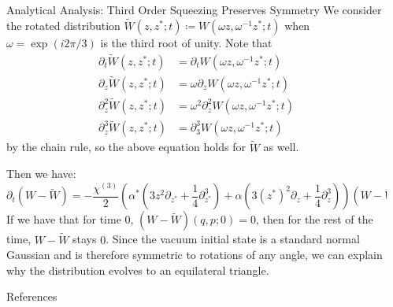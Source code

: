 \documentclass[final]{beamer}
\newcommand*{\wigner}{W(\omega z, \omega^{-1}z^{*};t)}
\newlength{\sepwidth}
\newlength{\colwidth}
\newcommand{\separatorcolumn}{\begin{column}{\sepwidth}\end{column}}
\begin{document}
\begin{frame}[t]
\begin{columns}[t]
\begin{column}{\colwidth}
\begin{block}{Analytical Analysis: Third Order Squeezing Preserves Symmetry}
        We consider the rotated distribution $\tilde{W}(z,z^{*};t)\coloneq W(\omega z, \omega^{-1}z^{*};t)$ when $\omega=\exp(i2\pi/3)$ is the third root of unity.
        Note that
        \begin{align*}
          \partial_{t}\tilde{W}(z,z^{*};t)     & =\partial_{t}\wigner               \\
          \partial_{z}\tilde{W}(z,z^{*};t)     & =\omega\partial_{z}\wigner         \\
          \partial_{z}^{2}\tilde{W}(z,z^{*};t) & =\omega^{2}\partial_{z}^{2}\wigner \\
          \partial_{z}^{3}\tilde{W}(z,z^{*};t) & =\partial_{3}^{3}\wigner
        \end{align*}
        by the chain rule, so the above equation holds for $\tilde{W}$ as well.

        Then we have:
        \[\partial_{t}(W-\tilde{W})=-\frac{\chi^{(3)}}{2}\left(\alpha^{*}\left(3z^{2}\partial_{z^{*}}+\frac{1}{4}\partial_{z^{*}}^{3}\right)+\alpha\left(3(z^{*})^{2}\partial_{z}+\frac{1}{4}\partial_{z}^{3}\right)\right)(W-\tilde{W})\]
        If we have that for time $0$, $(W-\tilde{W})(q,p;0)=0$, then for the rest of the time, $W-\tilde{W}$ stays $0$.
        Since the vacuum initial state is a standard normal Gaussian and is therefore symmetric to rotations of any angle, we can explain why the distribution evolves to an equilateral triangle.
      \end{block}

      \begin{block}{References}
        \nocite{*}
        \footnotesize{}
      \end{block}

    \end{column}

    \separatorcolumn
  \end{columns}
\end{frame}
\end{document}
